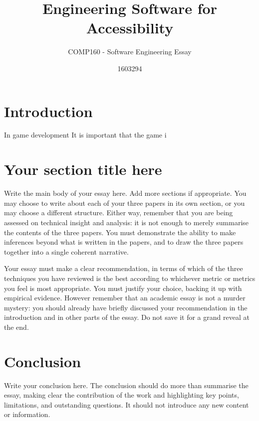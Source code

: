 \documentclass{scrartcl}
\title{Engineering Software for Accessibility}
\subtitle{COMP160 - Software Engineering Essay}
\author{1603294}
\begin{document}
\maketitle


\section{Introduction}

In game development It is important that the game i

\section{Your section title here}

Write the main body of your essay here. Add more sections if appropriate. You may choose to write about each of your three papers in its own section, or you may choose a different structure. Either way, remember that you are being assessed on technical insight and analysis: it is not enough to merely summarise the contents of the three papers. You must demonstrate the ability to make inferences beyond what is written in the papers, and to draw the three papers together into a single coherent narrative.

Your essay must make a clear recommendation, in terms of which of the three techniques you have reviewed is the best according to whichever metric or metrics you feel is most appropriate. You must justify your choice, backing it up with empirical evidence. However remember that an academic essay is not a murder mystery: you should already have briefly discussed your recommendation in the introduction and in other parts of the essay. Do not save it for a grand reveal at the end.

\section{Conclusion}

Write your conclusion here. The conclusion should do more than summarise the essay, making clear the contribution of the work and highlighting key points, limitations, and outstanding questions. It should not introduce any new content or information.



\end{document}
